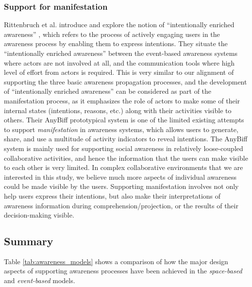 \subsubsection{Support for manifestation} %
\label{ssub:support_for_manifestation}
Rittenbruch et al. introduce and explore the notion of ``intentionally enriched awareness'' \cite{Rittenbruch2007}, which refers to the process of actively engaging users in the awareness process by enabling them to express intentions. They situate the ``intentionally enriched awareness'' between the event-based awareness systems where actors are not involved at all, and the communication tools where high level of effort from actors is required. This is very similar to our alignment of supporting the three basic awareness propagation processes, and the development of ``intentionally enriched awareness'' can be considered as part of the manifestation process, as it emphasizes the role of actors to make some of their internal states (intentions, reasons, etc.) along with their activities visible to others. Their AnyBiff prototypical system is one of the limited existing attempts to support \emph{manifestation} in awareness systems, which allows users to generate, share, and use a multitude of activity indicators to reveal intentions. The AnyBiff system is mainly used for supporting social awareness in relatively loose-coupled collaborative activities, and hence the information that the users can make visible to each other is very limited. In complex collaborative environments that we are interested in this study, we believe much more aspects of individual awareness could be made visible by the users. Supporting manifestation involves not only help users express their intentions, but also make their interpretations of awareness information during comprehension/projection, or the results of their decision-making visible.

\subsection{Summary} %
\label{sub:summary}
Table \ref{tab:awareness_models} shows a comparison of how the major design aspects of supporting awareness processes have been achieved in the \emph{space-based} and \emph{event-based} models.

